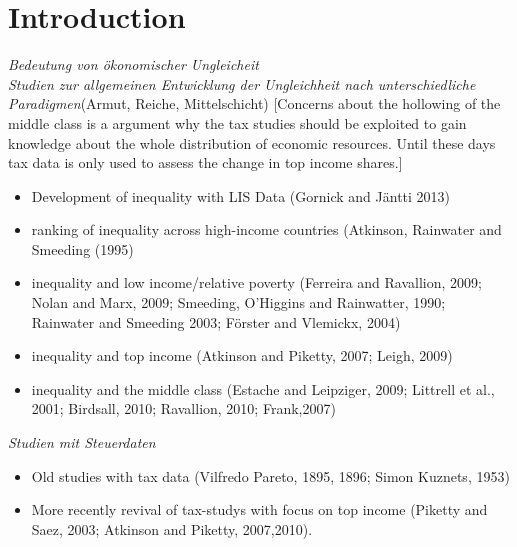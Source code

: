 
\section{Introduction}



\emph{Bedeutung von ökonomischer Ungleicheit} \\

\emph{Studien zur allgemeinen Entwicklung der Ungleichheit nach unterschiedliche Paradigmen}(Armut, Reiche, Mittelschicht)  [Concerns about the hollowing of the middle class is a argument why the tax studies should be exploited to gain knowledge about the whole distribution of economic resources. Until these days tax data is only used to assess the change in top income shares.] \\
\begin{itemize}
  \item Development of inequality with LIS Data (Gornick and Jäntti 2013)
  \item ranking of inequality across high-income countries (Atkinson, Rainwater and Smeeding (1995)
   \item inequality and low income/relative poverty (Ferreira and Ravallion, 2009; Nolan and Marx, 2009; Smeeding, O’Higgins and Rainwatter, 1990; Rainwater and Smeeding 2003; Förster and Vlemickx, 2004)
  \item inequality and top income (Atkinson and Piketty, 2007; Leigh, 2009)
  \item inequality and the middle class (Estache and Leipziger, 2009; Littrell et al., 2001; Birdsall, 2010; Ravallion, 2010; Frank,2007)
\end{itemize}


\emph{Studien mit Steuerdaten}
\begin{itemize}
\item Old studies with tax data (Vilfredo Pareto, 1895, 1896; Simon Kuznets, 1953)
\item More recently revival of tax-studys with focus on top income (Piketty and Saez, 2003; Atkinson and Piketty, 2007,2010).
\end{itemize}

